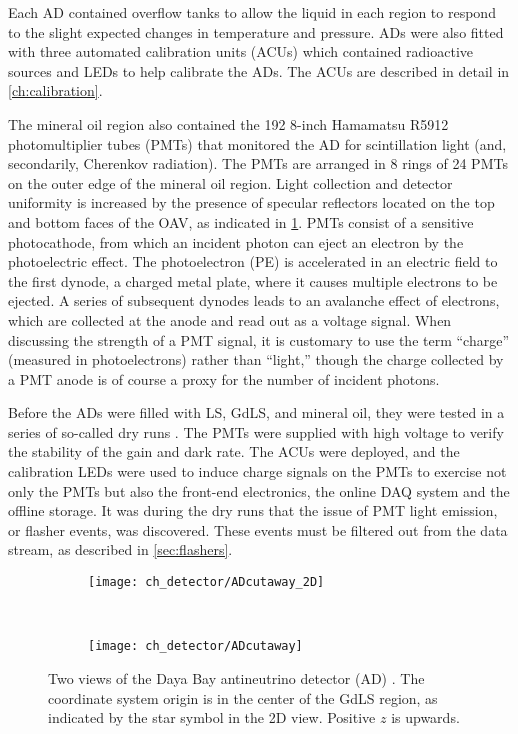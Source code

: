 Each AD contained overflow tanks to allow the liquid in each region
to respond to the slight expected changes in temperature and pressure.
ADs were also fitted with three automated calibration units (ACUs)
which contained radioactive sources and LEDs to help calibrate the ADs.
The ACUs are described in detail in \cref{ch:calibration}.

The mineral oil region also contained the 192 8-inch Hamamatsu R5912
photomultiplier tubes (PMTs) that monitored the AD for scintillation light
(and, secondarily, Cherenkov radiation).
The PMTs are arranged in 8 rings of 24 PMTs on the outer edge of the mineral oil region.
Light collection and detector uniformity is increased by the presence of
specular reflectors located on the top and bottom faces of the OAV,
as indicated in \cref{fig:ad_cutaway}.
PMTs consist of a sensitive photocathode, from which an incident photon
can eject an electron by the photoelectric effect.
The photoelectron (PE) is accelerated in an electric field to the first dynode,
a charged metal plate, where it causes multiple electrons to be ejected.
A series of subsequent dynodes leads to an avalanche effect of electrons,
which are collected at the anode and read out as a voltage signal.
When discussing the strength of a PMT signal,
it is customary to use the term ``charge'' (measured in photoelectrons)
rather than ``light,''
though the charge collected by a PMT anode
is of course a proxy for the number of incident photons.

Before the ADs were filled with LS, GdLS, and mineral oil,
they were tested in a series of so-called dry runs \cite{dryrun1}.
The PMTs were supplied with high voltage
to verify the stability of the gain and dark rate.
The ACUs were deployed, and the calibration LEDs
were used to induce charge signals on the PMTs
to exercise not only the PMTs but also the front-end electronics,
the online DAQ system and the offline storage.
It was during the dry runs that the issue of PMT light emission,
or flasher events, was discovered.
These events must be filtered out from the data stream,
as described in \cref{sec:flashers}.

\begin{figure}
    \centering
    \begin{subfigure}{\textwidth}
        \centering
        \texttt{[image: ch\_detector/ADcutaway\_2D]}
    \end{subfigure}
    \vspace{1cm}\\
    \begin{subfigure}[0.4\textheight]{\textwidth}
        \centering
        \texttt{[image: ch\_detector/ADcutaway]}
    \end{subfigure}
    \caption{
        Two views of the Daya Bay antineutrino detector (AD)
        \cite{ngd2016,internal_files}.
        The coordinate system origin is in the center of the GdLS region,
        as indicated by the star symbol in the 2D view.
        Positive $z$ is upwards.
    }
    \label{fig:ad_cutaway}
\end{figure}

